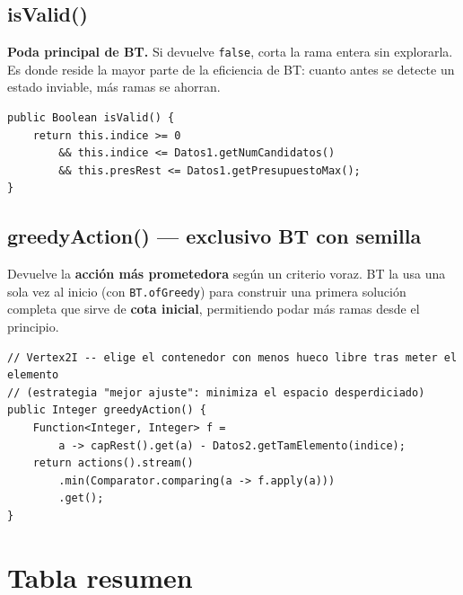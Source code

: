 \documentclass[12pt, a4paper]{article}
\begin{document}
\subsection{isValid()}

\textbf{Poda principal de BT.} Si devuelve \texttt{false}, corta la rama entera sin explorarla. Es donde reside la mayor parte de la eficiencia de BT: cuanto antes se detecte un estado inviable, más ramas se ahorran.

\begin{lstlisting}[style=java]
public Boolean isValid() {
    return this.indice >= 0
        && this.indice <= Datos1.getNumCandidatos()
        && this.presRest <= Datos1.getPresupuestoMax();
}
\end{lstlisting}

\subsection{greedyAction() --- exclusivo BT con semilla}

Devuelve la \textbf{acción más prometedora} según un criterio voraz. BT la usa una sola vez al inicio (con \texttt{BT.ofGreedy}) para construir una primera solución completa que sirve de \textbf{cota inicial}, permitiendo podar más ramas desde el principio.

\begin{lstlisting}[style=java]
// Vertex2I -- elige el contenedor con menos hueco libre tras meter el elemento
// (estrategia "mejor ajuste": minimiza el espacio desperdiciado)
public Integer greedyAction() {
    Function<Integer, Integer> f =
        a -> capRest().get(a) - Datos2.getTamElemento(indice);
    return actions().stream()
        .min(Comparator.comparing(a -> f.apply(a)))
        .get();
}
\end{lstlisting}

\section{Tabla resumen}
\end{document}
